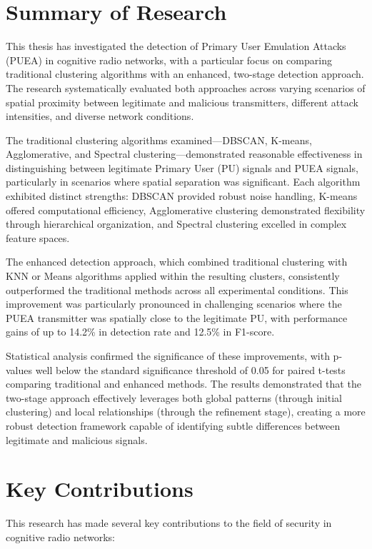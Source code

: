 \section{Summary of Research}

This thesis has investigated the detection of Primary User Emulation Attacks (PUEA) in cognitive radio networks, with a particular focus on comparing traditional clustering algorithms with an enhanced, two-stage detection approach. The research systematically evaluated both approaches across varying scenarios of spatial proximity between legitimate and malicious transmitters, different attack intensities, and diverse network conditions.

The traditional clustering algorithms examined—DBSCAN, K-means, Agglomerative, and Spectral clustering—demonstrated reasonable effectiveness in distinguishing between legitimate Primary User (PU) signals and PUEA signals, particularly in scenarios where spatial separation was significant. Each algorithm exhibited distinct strengths: DBSCAN provided robust noise handling, K-means offered computational efficiency, Agglomerative clustering demonstrated flexibility through hierarchical organization, and Spectral clustering excelled in complex feature spaces.

The enhanced detection approach, which combined traditional clustering with KNN or Means algorithms applied within the resulting clusters, consistently outperformed the traditional methods across all experimental conditions. This improvement was particularly pronounced in challenging scenarios where the PUEA transmitter was spatially close to the legitimate PU, with performance gains of up to 14.2\% in detection rate and 12.5\% in F1-score.

Statistical analysis confirmed the significance of these improvements, with p-values well below the standard significance threshold of 0.05 for paired t-tests comparing traditional and enhanced methods. The results demonstrated that the two-stage approach effectively leverages both global patterns (through initial clustering) and local relationships (through the refinement stage), creating a more robust detection framework capable of identifying subtle differences between legitimate and malicious signals.

\section{Key Contributions}

This research has made several key contributions to the field of security in cognitive radio networks:

